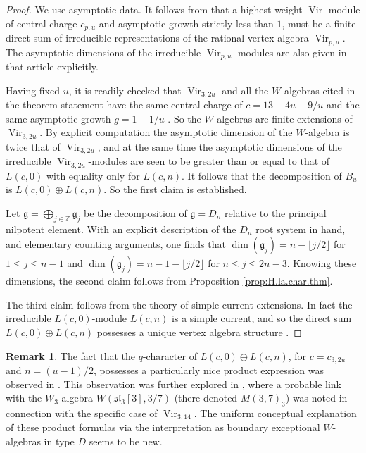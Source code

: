 \documentclass[12pt]{amsart}
\theoremstyle{plain}
\theoremstyle{definition}
\newtheorem{rem}[thm]{Remark}
\numberwithin{equation}{section}
\DeclareMathOperator{\Vir}{Vir}
\newcommand{\Z}{\mathbb{Z}}
\newcommand{\g}{\mathfrak{g}}
\newcommand{\sll}{\mathfrak{sl}}
\begin{document}
\begin{proof}
We use asymptotic data. It follows from {\cite[Proposition 4]{KW88}} that a highest weight $\Vir$-module of central charge $c_{p, u}$ and asymptotic growth strictly less than $1$, must be a finite direct sum of irreducible representations of the rational vertex algebra $\Vir_{p, u}$. The asymptotic dimensions of the irreducible $\Vir_{p, u}$-modules are also given in that article explicitly.

Having fixed $u$, it is readily checked that $\Vir_{3, 2u}$ and all the $W$-algebras cited in the theorem statement have the same central charge of $c = 13 - 4u - 9/u$ {\cite[Theorem 2.2]{KRW03}} and the same asymptotic growth $g = 1-1/u$ {\cite[Theorem 2.16]{KW2009}}. So the $W$-algebras are finite extensions of $\Vir_{3, 2u}$. By explicit computation the asymptotic dimension of the $W$-algebra is twice that of $\Vir_{3, 2u}$, and at the same time the asymptotic dimensions of the irreducible $\Vir_{3, 2u}$-modules are seen to be greater than or equal to that of $L(c, 0)$ with equality only for $L(c, n)$. It follows that the decomposition of $B_u$ is $L(c, 0) \oplus L(c, n)$. So the first claim is established.

Let $\g = \bigoplus_{j \in \Z} \g_j$ be the decomposition of $\g = D_n$ relative to the principal nilpotent element. With an explicit description of the $D_n$ root system in hand, and elementary counting arguments, one finds that $\dim(\g_j) = n-\lfloor j/2 \rfloor$ for $1 \leq j \leq n-1$ and $\dim(\g_j) = n-1-\lfloor j/2 \rfloor$ for $n \leq j \leq 2n-3$. Knowing these dimensions, the second claim follows from Proposition \ref{prop:H.la.char.thm}.

The third claim follows from the theory of simple current extensions. In fact the irreducible $L(c, 0)$-module $L(c, n)$ is a simple current, and so the direct sum $L(c, 0) \oplus L(c, n)$ possesses a unique vertex algebra structure {\cite[Section 5]{DM-ceff}} {\cite[Section 2]{Y}}.

\end{proof}


\begin{rem}
The fact that the $q$-character of $L(c, 0) \oplus L(c, n)$, for $c = c_{3, 2u}$ and $n = (u-1)/2$, possesses a particularly nice product expression was observed in \cite{BF2000}. This observation was further explored in \cite{FFW}, where a probable link with the $W_3$-algebra $W(\sll_3[3], 3/7)$ (there denoted $M(3, 7)_3$) was noted in connection with the specific case of $\Vir_{3, 14}$. The uniform conceptual explanation of these product formulas via the interpretation as boundary exceptional $W$-algebras in type $D$ seems to be new.
\end{rem}
\end{document}
